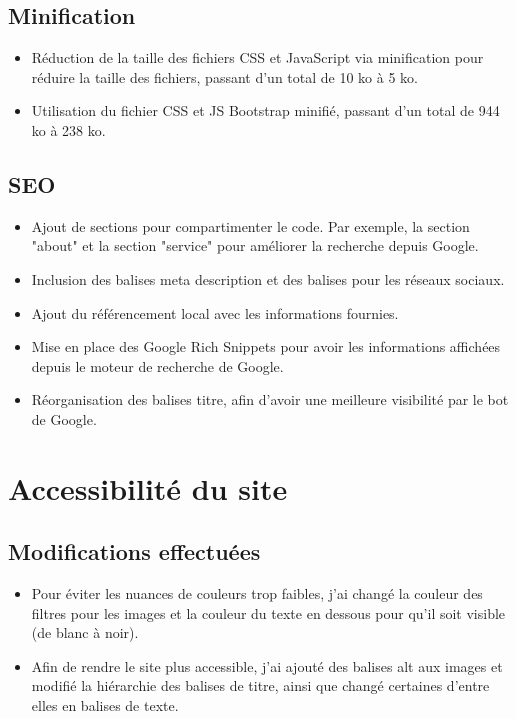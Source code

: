 \documentclass[12pt, a4paper]{article}
\begin{document}
\subsection{Minification}
\begin{itemize}
    \item Réduction de la taille des fichiers CSS et JavaScript via minification pour réduire la taille des fichiers, passant d'un total de 10 ko à 5 ko.
    \item Utilisation du fichier CSS et JS Bootstrap minifié, passant d'un total de 944 ko à 238 ko.
\end{itemize}

\subsection{SEO}
\begin{itemize}
    \item Ajout de sections pour compartimenter le code. Par exemple, la section "about" et la section "service" pour améliorer la recherche depuis Google.
    \item Inclusion des balises meta description et des balises pour les réseaux sociaux.
    \item Ajout du référencement local avec les informations fournies.
    \item Mise en place des Google Rich Snippets pour avoir les informations affichées depuis le moteur de recherche de Google.
    \item Réorganisation des balises titre, afin d'avoir une meilleure visibilité par le bot de Google.
\end{itemize}

\section{Accessibilité du site}
\subsection{Modifications effectuées}
\begin{itemize}
    \item Pour éviter les nuances de couleurs trop faibles, j’ai changé la couleur des filtres pour les images et la couleur du texte en dessous pour qu’il soit visible (de blanc à noir).
    \item Afin de rendre le site plus accessible, j'ai ajouté des balises alt aux images et modifié la hiérarchie des balises de titre, ainsi que changé certaines d'entre elles en balises de texte.
\end{itemize}
\newpage
\end{document}
